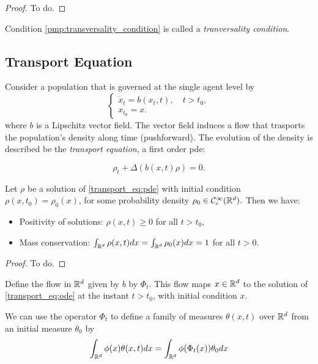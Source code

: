 \documentclass{article}
\begin{document}
\begin{proof}
    To do.
\end{proof}

Condition \eqref{pmp:transversality_condition} is called a \textit{tranversality condition}.

\subsection{Transport Equation}\label{transport_eq}
Consider a population that is governed at the single agent level by
\begin{equation}\label{transport_eq:ode}
\begin{cases}
    \dot x_t = b(x_t,t), \quad t > t_0,\\
    x_{t_0} = x.
\end{cases}
\end{equation}
where $b$ is a Lipschitz vector field. The vector field induces a flow that trasports the population's density along time (pushforward). The evolution of the density is described be the \textit{transport equation}, a first order pde:  

\begin{equation}\label{transport_eq:pde}
\rho_t + \Delta(b(x,t) \rho) = 0.
\end{equation}

\begin{proposition}    
Let $\rho$ be a solution of \eqref{transport_eq:pde} with initial condition $\rho(x,t_0) = \rho_0(x)$, for some probability density $\rho_0 \in \mathcal{C}_c^\infty (\mathbb{R}^d).$ Then we have:
\begin{itemize}
    \item Positivity of solutions: $\rho(x,t) \geq 0$ for all $t> t_0$,
    \item Mass conservation: $\int_{\mathbb{R}^d} \rho(x,t) dx = \int_{\mathbb{R}^d} \rho_0(x) dx = 1$ for all $t > 0$.
\end{itemize}
\end{proposition}

\begin{proof}
    To do.
\end{proof}

Define the flow in $\mathbb{R}^d$ given by $b$ by $\Phi_t$. This flow maps $x\in \mathbb{R}^d$ to the solution of \eqref{transport_eq:ode} at the instant $t > t_0$, with initial condition $x$.

We can use the operator $\Phi_t$ to define a family of measures $\theta(x,t)$ over $\mathbb{R}^d$ from an initial measure $\theta_0$ by 
\begin{equation}\label{transport_eq:family_of_measures}
\int_{\mathbb{R}^d} \phi(x) \theta(x,t) dx = \int_{\mathbb{R}^d} \phi(\Phi_t(x)) \theta_0 dx    
\end{equation}
\end{document}
